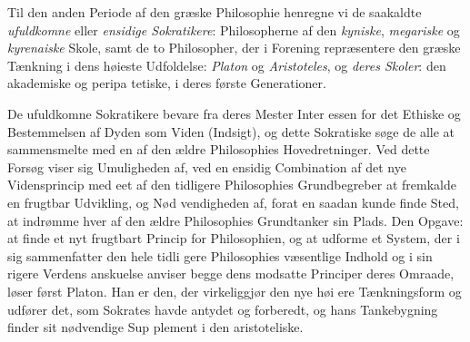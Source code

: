 \documentclass[12pt,a4paper]{book}
\begin{document}
Til den anden Periode af den græske Philosophie henregne
vi de saakaldte \emph{ufuldkomne} eller \emph{ensidige Sokratikere}:
Philosopherne af den \emph{kyniske}, \emph{megariske} og \emph{kyrenaiske}
Skole, samt de to Philosopher, der i Forening repræsentere
den græske Tænkning i dens høieste Udfoldelse: \emph{Platon} og
\emph{Aristoteles}, og \emph{deres Skoler}: den akademiske og peripa\-%
tetiske, i deres første Generationer.

De ufuldkomne Sokratikere bevare fra deres Mester Inter\-%
essen for det Ethiske og Bestemmelsen af Dyden som Viden
(Indsigt), og dette Sokratiske søge de alle at sammensmelte
med en af den ældre Philosophies Hovedretninger. Ved dette
Forsøg viser sig Umuligheden af, ved en ensidig Combination
af det nye Vidensprincip med eet af den tidligere Philosophies
Grundbegreber at fremkalde en frugtbar Udvikling, og Nød\-%
vendigheden af, forat en saadan kunde finde Sted, at indrømme
hver af den ældre Philosophies Grundtanker sin Plads. Den
Opgave: at finde et nyt frugtbart Princip for Philosophien, og
at udforme et System, der i sig sammenfatter den hele tidli\-%
gere Philosophies væsentlige Indhold og i sin rigere Verdens\-%
anskuelse anviser begge dens modsatte Principer deres Omraade,
løser først Platon. Han er den, der virkeliggjør den nye høi\-%
ere Tænkningsform og udfører det, som Sokrates havde antydet
og forberedt, og hans Tankebygning finder sit nødvendige Sup\-%
plement i den aristoteliske.
\end{document}
